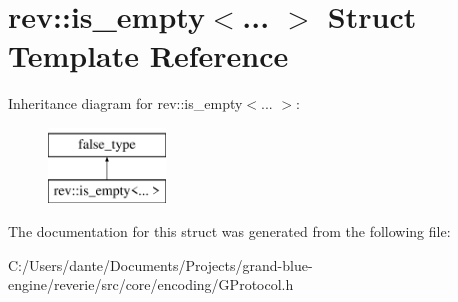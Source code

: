 \hypertarget{structrev_1_1is__empty}{}\section{rev\+::is\+\_\+empty$<$... $>$ Struct Template Reference}
\label{structrev_1_1is__empty}
Inheritance diagram for rev\+::is\+\_\+empty$<$... $>$\+:\begin{figure}[H]
\begin{center}
\leavevmode
\includegraphics[height=2.000000cm]{structrev_1_1is__empty}
\end{center}
\end{figure}


The documentation for this struct was generated from the following file\+:\begin{DoxyCompactItemize}
\item 
C\+:/\+Users/dante/\+Documents/\+Projects/grand-\/blue-\/engine/reverie/src/core/encoding/G\+Protocol.\+h\end{DoxyCompactItemize}
